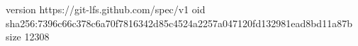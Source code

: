 version https://git-lfs.github.com/spec/v1
oid sha256:7396c66c378c6a70f7816342d85c4524a2257a047120fd132981ead8bd11a87b
size 12308
